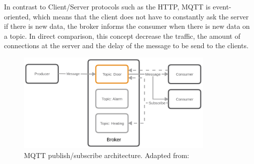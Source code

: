 In contrast to Client/Server protocols such as the \acs{HTTP}, \ac{MQTT} is event-oriented, which means that the client does not have to constantly ask the server if there is new data, the broker informs the consumer when there is new data on a topic.\autocite[cf.]{Bayer:MQTT}
In direct comparison, this concept decrease the traffic, the amount of connections at the server and the delay of the message to be send to the clients.

\begin{figure}[H]
    \centering
    \includegraphics[width=0.85\textwidth]{resources/images/mqtt_architecture.png}
    \caption[MQTT publish/subscribe architecture]{MQTT publish/subscribe architecture. Adapted from: \autocite{Bayer:MQTT}}
    \label{fig:mqtt_architecture}
\end{figure}

